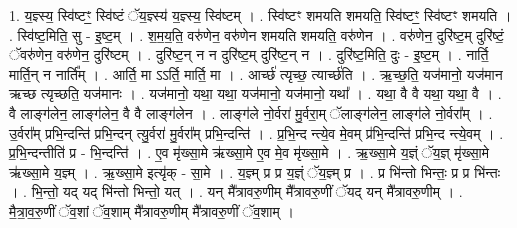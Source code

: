 \documentclass[17pt]{extarticle}
\begin{document}
1. य॒ज्ञ्स्य॒ स्वि॑ष्टꣳ॒॒ स्वि॑ष्टं ॅय॒ज्ञ्स्य॑ य॒ज्ञ्स्य॒ स्वि॑ष्टम् । . स्वि॑ष्टꣳ शमयति शमयति॒ स्वि॑ष्टꣳ॒॒ स्वि॑ष्टꣳ शमयति । . स्वि॑ष्ट॒मिति॒ सु - इ॒ष्ट॒म् । . श॒म॒य॒ति॒ वरु॑णेन॒ वरु॑णेन शमयति शमयति॒ वरु॑णेन । . वरु॑णेन॒ दुरि॑ष्ट॒म् दुरि॑ष्टं॒ ॅवरु॑णेन॒ वरु॑णेन॒ दुरि॑ष्टम् । . दुरि॑ष्ट॒न् न न दुरि॑ष्ट॒म् दुरि॑ष्ट॒न् न । . दुरि॑ष्ट॒मिति॒ दुः - इ॒ष्ट॒म् । . नार्ति॒ मार्ति॒न् न नार्ति᳚म् । . आर्ति॒ मा ऽऽर्ति॒ मार्ति॒ मा । . आर्च्छ॑ त्यृच्छ॒ त्यार्च्छ॑ति । . ऋ॒च्छ॒ति॒ यज॑मानो॒ यज॑मान ऋच्छ त्यृच्छति॒ यज॑मानः । . यज॑मानो॒ यथा॒ यथा॒ यज॑मानो॒ यज॑मानो॒ यथा᳚ । . यथा॒ वै वै यथा॒ यथा॒ वै । . वै लाङ्ग॑लेन॒ लाङ्ग॑लेन॒ वै वै लाङ्ग॑लेन । . लाङ्ग॑ले नो॒र्वरा॑ मु॒र्वरा॒म् ॅलाङ्ग॑लेन॒ लाङ्ग॑ले नो॒र्वरा᳚म् । . उ॒र्वरा᳚म् प्रभि॒न्दन्ति॑ प्रभि॒न्दन् त्यु॒र्वरा॑ मु॒र्वरा᳚म् प्रभि॒न्दन्ति॑ । . प्र॒भि॒न्द न्त्ये॒व मे॒वम् प्र॑भि॒न्दन्ति॑ प्रभि॒न्द न्त्ये॒वम् । . प्र॒भि॒न्दन्तीति॑ प्र - भि॒न्दन्ति॑ । . ए॒व मृ॑ख्सा॒मे ऋ॑ख्सा॒मे ए॒व मे॒व मृ॑ख्सा॒मे । . ऋ॒ख्सा॒मे य॒ज्ञ्ं ॅय॒ज्ञ् मृ॑ख्सा॒मे ऋ॑ख्सा॒मे य॒ज्ञ्म् । . ऋ॒ख्सा॒मे इत्यृ॑क् - सा॒मे । . य॒ज्ञ्म् प्र प्र य॒ज्ञ्ं ॅय॒ज्ञ्म् प्र । . प्र भि॑न्तो भिन्तः॒ प्र प्र भि॑न्तः । . भि॒न्तो॒ यद् यद् भि॑न्तो भिन्तो॒ यत् । . यन् मै᳚त्रावरु॒णीम् मै᳚त्रावरु॒णीं ॅयद् यन् मै᳚त्रावरु॒णीम् । . मै॒त्रा॒व॒रु॒णीं ॅव॒शां ॅव॒शाम् मै᳚त्रावरु॒णीम् मै᳚त्रावरु॒णीं ॅव॒शाम् । \newline
\end{document}
